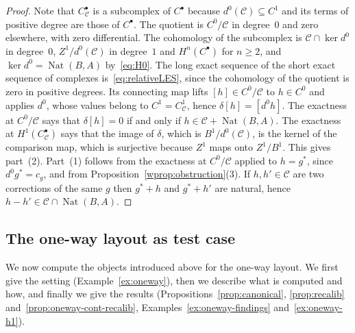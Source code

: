 \documentclass[11pt,a4paper]{article}
\theoremstyle{plain}
\theoremstyle{definition}
\theoremstyle{remark}
\DeclareMathOperator{\Nat}{Nat}
\begin{document}
\begin{proof}
Note that $C^{\bullet}_{\mathcal{C}}$ is a subcomplex of $C^{\bullet}$ because
$d^{0}(\mathcal{C}) \subseteq C^{1}$ and its terms of positive degree are those
of $C^{\bullet}$. The quotient is $C^{0}/\mathcal{C}$ in degree~$0$ and zero
elsewhere, with zero differential. The cohomology of the subcomplex is
$\mathcal{C} \cap \ker d^{0}$ in degree~$0$, $Z^{1}/d^{0}(\mathcal{C})$ in
degree~$1$ and $H^{n}(C^{\bullet})$ for $n \ge 2$, and
$\ker d^{0} = \Nat(B,A)$ by~\eqref{eq:H0}. The long exact sequence of the
short exact sequence of complexes is~\eqref{eq:relativeLES}, since the
cohomology of the quotient is zero in positive degrees. Its connecting map
lifts $[h] \in C^{0}/\mathcal{C}$ to $h \in C^{0}$ and applies $d^{0}$, whose
values belong to $C^{1} = C^{1}_{\mathcal{C}}$, hence
$\delta[h] = [d^{0}h]$. The exactness at $C^{0}/\mathcal{C}$ says that
$\delta[h] = 0$ if and only if $h \in \mathcal{C} + \Nat(B,A)$. The exactness
at $H^{1}(C^{\bullet}_{\mathcal{C}})$ says that the image of $\delta$, which
is $B^{1}/d^{0}(\mathcal{C})$, is the kernel of the comparison map, which is
surjective because $Z^{1}$ maps onto $Z^{1}/B^{1}$. This gives part~(2).
Part~(1) follows from the exactness at $C^{0}/\mathcal{C}$ applied to
$h = g^{*}$, since $d^{0}g^{*} = c_g$, and from
Proposition~\ref{wprop:obstruction}(3). If $h,h' \in \mathcal{C}$ are two
corrections of the same $g$ then $g^{*}+h$ and $g^{*}+h'$ are natural, hence
$h - h' \in \mathcal{C} \cap \Nat(B,A)$.
\end{proof}

\subsection{The one-way layout as test case}

We now compute the objects introduced above for the one-way layout. We first
give the setting (Example~\ref{ex:oneway}), then we describe what is computed
and how, and finally we give the results
(Propositions~\ref{prop:canonical}, \ref{prop:recalib}
and~\ref{prop:oneway-cont-recalib},
Examples~\ref{ex:oneway-findings} and~\ref{ex:oneway-h1}).
\end{document}
